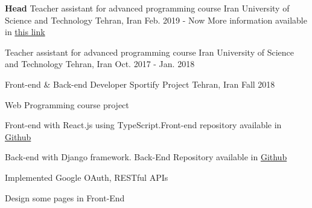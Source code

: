 

\begin{cventries}

  \cventry
  {\textbf{Head} Teacher assistant for advanced programming course} %
  {Iran University of Science and Technology} %
  {Tehran, Iran} %
  {Feb. 2019 - Now} %
  {More information available in \textcolor{blue}{\href{https://sauleh.github.io/ap97/}{this link}}}

  \cventry
  {Teacher assistant for advanced programming course} %
  {Iran University of Science and Technology} %
  {Tehran, Iran} %
  {Oct. 2017 - Jan. 2018} %
  {}

  \cventry
  {Front-end \& Back-end Developer} %
  {Sportify Project} %
  {Tehran, Iran} %
  {Fall 2018} %
  {
    \begin{cvitems} %
      \item {Web Programming course project}
      \item {Front-end with React.js using TypeScript.Front-end repository available in \href{https://github.com/ali4heydari/sportify-frontend}{Github}}
      \item {Back-end with Django framework. Back-End Repository available in \href{https://github.com/ali4heydari/sportify-backend}{Github}}
      \item {Implemented Google OAuth, RESTful APIs}
      \item {Design some pages in Front-End}
    \end{cvitems}
  }
  


\end{cventries}
